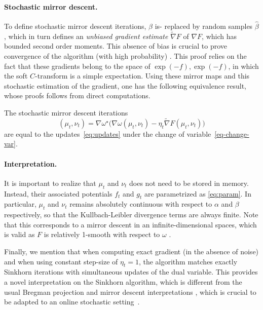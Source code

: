 \paragraph{Stochastic mirror descent.}

To define stochastic mirror descent iterations, $\beta$ is- replaced by random samples $\hat \beta$, which in turn defines an \textit{unbiased gradient estimate} $\tilde \nabla F$ of $\nabla F$, which has bounded second order moments.
%
This absence of bias is crucial to prove convergence of the algorithm (with high
probability) . This proof relies on the fact that these gradients belong to  the space of  $\exp(-f),
\exp(-f)$, in which the soft $C$-transform is a simple expectation. 
%
Using these mirror maps and this stochastic estimation of the gradient, one has the following equivalence result, whose proofs follows from direct computations. 

\begin{proposition}
The stochastic mirror descent iterations
\begin{equation}
    (\mu_t, \nu_t) = \nabla \omega^\star\Big( \nabla \omega(\mu_t, \nu_t) - 
    \eta_t \tilde \nabla F(\mu_t, \nu_t)\Big)
\end{equation}
are equal to the updates~\eqref{eq:updates} under the change of variable~\eqref{eq-change-var}.
\end{proposition}

\paragraph{Interpretation.} 

It is important to realize that $\mu_t$ and $\nu_t$ does not need to be stored in memory. Instead,
their associated potentials $f_t$ and $g_t$ are parametrized as
\eqref{eq:param}. In particular, $\mu_t$ and $\nu_t$ remains absolutely
continuous with respect to $\alpha$ and $\beta$ respectively, so that the
Kullbach-Leibler divergence terms are always finite. Note that this corresponds to a mirror descent
in an infinite-dimensional spaces, which is valid as $F$ is relatively 1-smooth with respect to
$\omega$ .

Finally, we mention that  when computing exact gradient (in the absence of noise) and when using constant step-size of
$\eta_t=1$, the algorithm matches exactly Sinkhorn iterations with simultaneous updates of the dual variable. This provides a novel interpretation on the Sinkhorn algorithm, which is different from the usual Bregman projection and mirror descent interpretations \citep{benamou2015iterative}, which is crucial to be adapted to an online stochastic setting~\cite{mishchenko2019sinkhorn}. 







